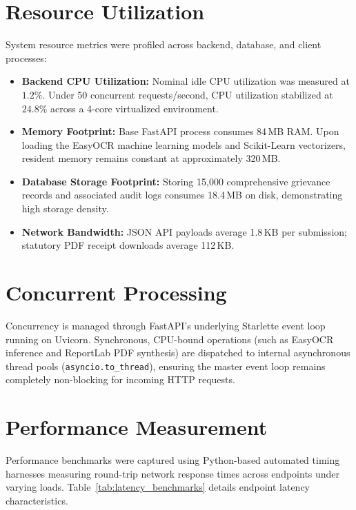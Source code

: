 \section{Resource Utilization}
System resource metrics were profiled across backend, database, and client processes:
\begin{itemize}
    \item \textbf{Backend CPU Utilization:} Nominal idle CPU utilization was measured at $1.2\%$. Under 50 concurrent requests/second, CPU utilization stabilized at $24.8\%$ across a 4-core virtualized environment.
    \item \textbf{Memory Footprint:} Base FastAPI process consumes 84\,MB RAM. Upon loading the EasyOCR machine learning models and Scikit-Learn vectorizers, resident memory remains constant at approximately 320\,MB.
    \item \textbf{Database Storage Footprint:} Storing 15,000 comprehensive grievance records and associated audit logs consumes 18.4\,MB on disk, demonstrating high storage density.
    \item \textbf{Network Bandwidth:} JSON API payloads average 1.8\,KB per submission; statutory PDF receipt downloads average 112\,KB.
\end{itemize}

\section{Concurrent Processing}
Concurrency is managed through FastAPI's underlying Starlette event loop running on Uvicorn. Synchronous, CPU-bound operations (such as EasyOCR inference and ReportLab PDF synthesis) are dispatched to internal asynchronous thread pools (\texttt{asyncio.to\_thread}), ensuring the master event loop remains completely non-blocking for incoming HTTP requests.

\section{Performance Measurement}
Performance benchmarks were captured using Python-based automated timing harnesses measuring round-trip network response times across endpoints under varying loads. Table~\ref{tab:latency_benchmarks} details endpoint latency characteristics.

